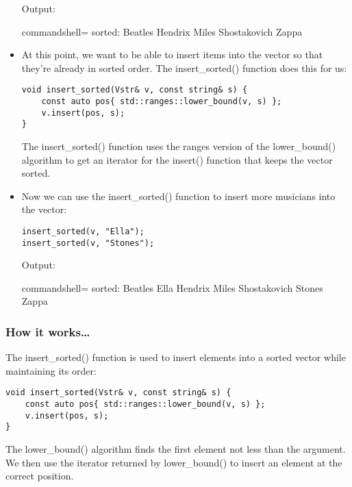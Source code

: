 \begin{itemize}
Output:

\begin{tcblisting}{commandshell={}}
sorted: Beatles Hendrix Miles Shostakovich Zappa
\end{tcblisting}

\item 
At this point, we want to be able to insert items into the vector so that they're already in sorted order. The insert\_sorted() function does this for us:

\begin{lstlisting}[style=styleCXX]
void insert_sorted(Vstr& v, const string& s) {
	const auto pos{ std::ranges::lower_bound(v, s) };
	v.insert(pos, s);
}
\end{lstlisting}

The insert\_sorted() function uses the ranges version of the lower\_bound() algorithm to get an iterator for the insert() function that keeps the vector sorted.

\item 
Now we can use the insert\_sorted() function to insert more musicians into the vector:

\begin{lstlisting}[style=styleCXX]
insert_sorted(v, "Ella");
insert_sorted(v, "Stones");
\end{lstlisting}

Output:

\begin{tcblisting}{commandshell={}}
sorted: Beatles Ella Hendrix Miles Shostakovich Stones Zappa
\end{tcblisting}
\end{itemize}

\subsubsection{How it works…}

The insert\_sorted() function is used to insert elements into a sorted vector while maintaining its order:

\begin{lstlisting}[style=styleCXX]
void insert_sorted(Vstr& v, const string& s) {
	const auto pos{ std::ranges::lower_bound(v, s) };
	v.insert(pos, s);
}
\end{lstlisting}

The lower\_bound() algorithm finds the first element not less than the argument. We then use the iterator returned by lower\_bound() to insert an element at the correct position.

